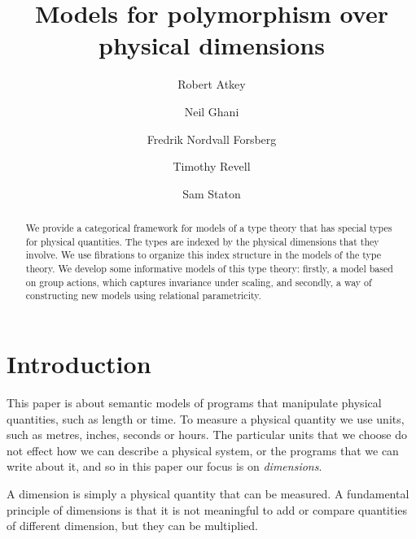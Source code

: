 \documentclass[a4paper,UKenglish]{lipics}
\title{Models for polymorphism over physical dimensions}
\author[1]{Robert Atkey}
\author[2]{Neil Ghani}
\author[2]{Fredrik Nordvall Forsberg}
\author[2]{Timothy Revell}
\author[3]{Sam Staton}
\affil[1]{University of Edinburgh}
\affil[2]{University of Strathclyde}
\affil[3]{University of Cambridge}
\newcommand{\UoM}{Units of Measure\xspace}
\newcommand{\UoMFibrations}{UoM-fibrations\xspace}
\begin{document}
\maketitle

\begin{abstract}
We provide a categorical framework for models of a type theory that has special types for physical quantities. The types are indexed by the physical dimensions that they involve. We use fibrations to organize this index structure in the models of the type theory. We develop some informative models of this type theory: firstly, a model based on group actions, which captures invariance under scaling, and secondly, a way of constructing new models using relational parametricity.

%
\end{abstract}

\section{Introduction}
This paper is about semantic models of programs that manipulate physical quantities, such as length or time. To measure a physical quantity we use units, such as metres, inches, seconds or hours. The particular units that we choose do not effect how we can describe a physical system, or the programs that we can write about it, and so in this paper our focus is on \emph{dimensions}.

A dimension is simply a physical quantity that can be measured. A fundamental principle of dimensions is that it is not meaningful to add or compare quantities of different dimension, but they can be multiplied.
\end{document}
